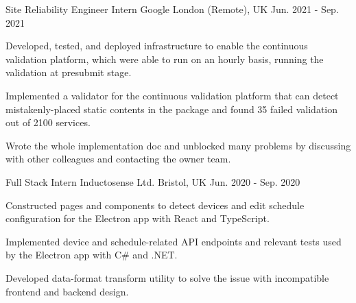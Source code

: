 

\begin{cventries}

  \cventry
    {Site Reliability Engineer Intern} %
    {Google} %
    {London (Remote), UK} %
    {Jun. 2021 - Sep. 2021} %
    {
      \begin{cvitems} %
        \item {Developed, tested, and deployed infrastructure to enable the continuous validation platform, which were able to run on an hourly basis, running the validation at presubmit stage.}
        \item {Implemented a validator for the continuous validation platform that can detect mistakenly-placed static contents in the package and found 35 failed validation out of 2100 services.}
        \item {Wrote the whole implementation doc and unblocked many problems by discussing with other colleagues and contacting the owner team.}
      \end{cvitems}
    }

  \cventry
    {Full Stack Intern} %
    {Inductosense Ltd.} %
    {Bristol, UK} %
    {Jun. 2020 - Sep. 2020} %
    {
      \begin{cvitems} %
        \item {Constructed pages and components to detect devices and edit schedule configuration for the Electron app with React and TypeScript.}
        \item {Implemented device and schedule-related API endpoints and relevant tests used by the Electron app with C\# and .NET.}
        \item {Developed data-format transform utility to solve the issue with incompatible frontend and backend design.}
      \end{cvitems}
    }



\end{cventries}
